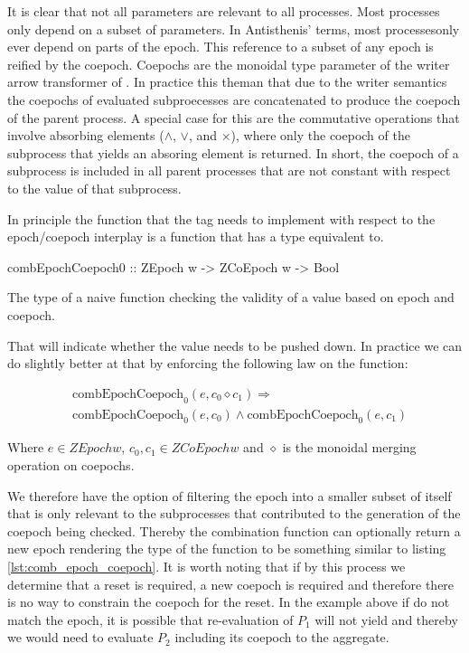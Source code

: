 It is clear that not all parameters are relevant to all processes.
Most processes only depend on a subset of parameters. In Antisthenis'
terms, most processesonly ever depend on parts of the epoch. This
reference to a subset of any epoch is reified by the coepoch. Coepochs
are the monoidal type parameter of the writer arrow transformer of
.  In practice this theman that due to the writer
semantics the coepochs of evaluated subproecesses are concatenated to
produce the coepoch of the parent process. A special case for this are
the commutative operations that involve absorbing elements (\(\land\),
\(\lor\), and \(\times\)), where only the coepoch of the subprocess
that yields an absoring element is returned. In short, the coepoch of
a subprocess is included in all parent processes that are not constant
with respect to the value of that subprocess.

In principle the function that the  tag needs to
implement with respect to the epoch/coepoch interplay is a function
that has a type equivalent to.

\begin{code}
\begin{haskellcode}
combEpochCoepoch0 :: ZEpoch w -> ZCoEpoch w -> Bool
\end{haskellcode}
  \caption{\label{sec:epochs_coepochs}The type of a naive function
    checking the validity of a value based on epoch and coepoch.}
\end{code}

That will indicate whether the value needs to be pushed down. In
practice we can do slightly better at that by enforcing the following
law on the  function:

\begin{align*}
& \text{combEpochCoepoch}_0(e, c_0 \diamond c_1) \Rightarrow \\
& \text{combEpochCoepoch}_0(e,c_0) \land \text{combEpochCoepoch}_0(e,c_1)
\end{align*}

Where \(e \in ZEpoch w\), \(c_0,c_1 \in ZCoEpoch w\) and \(\diamond\)
is the monoidal merging operation on coepochs.

We therefore have the option of filtering the epoch into a smaller
subset of itself that is only relevant to the subprocesses that
contributed to the generation of the coepoch being checked. Thereby
the combination function can optionally return a new epoch rendering
the type of the function to be something similar to listing
\ref{lst:comb_epoch_coepoch}. It is worth noting that if by this
process we determine that a reset is required, a new coepoch is
required and therefore there is no way to constrain the coepoch for
the reset. In the example above if  do not
match the epoch, it is possible that re-evaluation of \(P_1\) will not
yield  and thereby we would need to evaluate \(P_2\)
including its coepoch to the aggregate.

